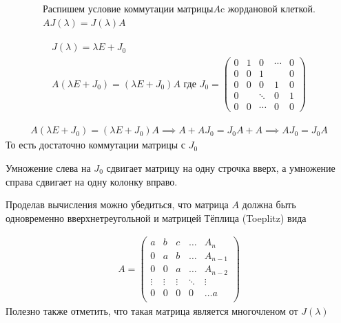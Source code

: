 \begin{sol}
\begin{gather*}
    \mbox{Распишем условие коммутации матрицы} A \mbox{c жордановой клеткой.} \\
    A J(\lambda) = J(\lambda) A
\end{gather*}

\begin{gather*}
    J(\lambda) = \lambda E + J_{0} \\
    A (\lambda E + J_{0}) = (\lambda E + J_{0}) A 
    \mbox{ где } J_{0} = \left(\begin{array}{ccccc}
       0 & 1 & 0 & \cdots & 0\\
       0 & 0 & 1 & & 0 \\
       0 & 0 & 0 & 1& 0\\
       0 & & \ddots & 0 &1\\
       0 & 0 & \cdots & 0 & 0
    \end{array}\right)
\end{gather*}

\begin{gather*}
     A (\lambda E + J_{0}) = (\lambda E + J_{0}) A  \implies A + A J_{0} =
     J_{0}A + A \implies A J_{0} = J_{0} A 
\end{gather*}
То есть достаточно коммутации матрицы с $J_{0}$

Умножение слева на $J_{0}$ сдвигает матрицу на одну строчка вверх,
а умножение справа сдвигает на одну колонку вправо.


Проделав вычисления можно убедиться, что матрица $A$ должна быть одновременно вверхнетреугольной и матрицей Тёплица (Toeplitz) вида

\begin{gather*}
A = \begin{pmatrix}
a & b & c & \dots & A_n \\
  0 & a & b  & \dots & A_{n-1} \\
  0 & 0 & a  & \dots & A_{n-2} \\
\vdots & \vdots & \vdots & \ddots & \vdots \\
0 & 0 & 0 & 0 &\dots a \\
\end{pmatrix}
\end{gather*}
Полезно также отметить, что такая матрица является многочленом от $J(\lambda)$
\end{sol}